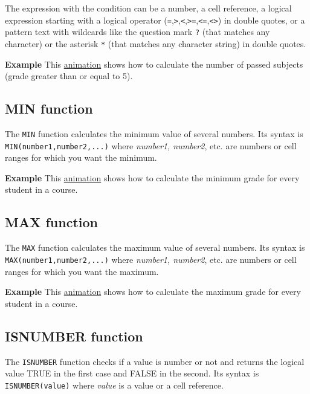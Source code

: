 The expression with the condition can be a number, a cell reference, a logical expression starting with a logical
operator
(\texttt{=},\texttt{\textgreater{}},\texttt{\textless{}},\texttt{\textgreater{}=},\texttt{\textless{}=},\texttt{\textless{}\textgreater{}})
in double quotes, or a pattern text with wildcards like the question mark \texttt{?} (that matches any character)
or the asterisk \texttt{*} (that matches any character string) in double quotes.

\textbf{Example} This \href{http://aprendeconalf.es/office/excel/manual/img/example_function_countif.gif}{animation} shows how to calculate the number of passed subjects (grade greater than or equal to 5).

\subsection{MIN function}\hypertarget{min-function}{}\label{min-function}

The \texttt{MIN} function calculates the minimum value of several numbers. Its syntax is
\texttt{MIN(number1,number2,...)} where \emph{number1, number2}, etc. are numbers or cell ranges for which you want the
minimum.

\textbf{Example} This \href{http://aprendeconalf.es/office/excel/manual/img/example_function_min.gif}{animation} shows how to calculate the minimum grade for every student in a course.

\subsection{MAX function}\hypertarget{max-function}{}\label{max-function}

The \texttt{MAX} function calculates the maximum value of several numbers. Its syntax is
\texttt{MAX(number1,number2,...)} where \emph{number1, number2}, etc. are numbers or cell ranges for which you want the
maximum.

\textbf{Example} This \href{http://aprendeconalf.es/office/excel/manual/img/example_function_max.gif}{animation} shows
how to calculate the maximum grade for every student in a course.


\subsection{ISNUMBER function}
\label{isnumberfunction}

The \texttt{ISNUMBER} function checks if a value is number or not and returns the logical value TRUE in the first case and FALSE in the second. Its syntax is \texttt{ISNUMBER(value)} where \emph{value} is a value or a cell reference.

